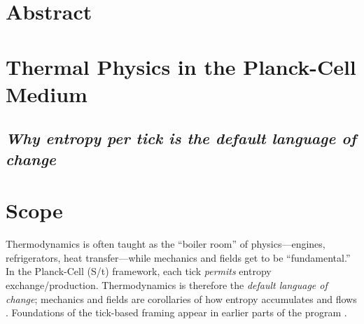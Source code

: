 \documentclass[11pt,oneside]{article}
\title{\PaperTitleMain}
\author{\Authors}
\author{\AuthorName}
\author{Author Name}
\date{\today}
\begin{document}
\maketitle


\section*{Abstract}


\section{Thermal Physics in the Planck-Cell Medium}
\subsection*{\textit{Why entropy per tick is the default language of change}}

\providecommand{\Sent}{S_{\mathrm{ent}}}             %
\newcommand{\Sphys}{S_{\mathrm{phys}}}               %
\newcommand{\dotSphys}{\dot{S}_{\mathrm{phys}}}      %

\section*{Scope}
Thermodynamics is often taught as the ``boiler room'' of physics—engines, refrigerators, heat transfer—while mechanics and fields get to be ``fundamental.'' In the Planck-Cell (S/t) framework, each tick \emph{permits} entropy exchange/production. Thermodynamics is therefore the \emph{default language of change}; mechanics and fields are corollaries of how entropy accumulates and flows \cite{callen1985thermodynamics}. Foundations of the tick-based framing appear in earlier parts of the program \cite{langstaff_zenodo_16908311}.
\end{document}
